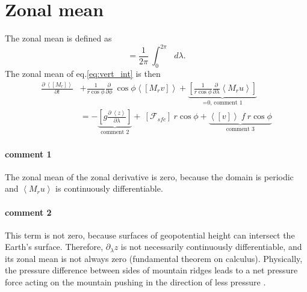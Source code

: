 \documentclass[11pt]{article}
\numberwithin{equation}{section}
\newcommand{\beq}{\begin{equation}}
\newcommand{\eeq}{\end{equation}}
\newcommand{\la}{\langle}
\newcommand{\ra}{\rangle}
\newcommand{\vect}[1]{\boldsymbol{#1}}
\newcommand{\Dt}[1]{\frac{D#1}{D t}}
\newcommand{\lara}[1]{\left\la{#1}\right\ra}
\newcommand{\cphi}{\cos \phi}
\begin{document}
\section{Zonal mean}
The zonal mean is defined as 
\beq
[~\cdot~] =  \frac{1}{2 \pi} ~ \int_0^ {2 \pi} ~~~ d\lambda.
\eeq
%
%
The zonal mean of eq.\eqref{eq:vert_int} is then 
\begin{align} \label{eq:vert_int_zm}
\frac{\partial ~\lara{[M_r]}}{\partial t}  &+ \frac{1}{r \cos{\phi}}  \frac{\partial}{\partial \phi}  ~\cos{\phi} \lara{ [M_r v] } + \underbrace{\left[ \frac{1}{r \cos{\phi}} \frac{\partial}{\partial \lambda} \lara{M_r u} \right]}_\text{=0, comment 1} \nonumber \\
 &=   - \underbrace{\left[ g  \frac{\partial~\lara{z}}{\partial \lambda}  \right]}_\text{comment 2}+ ~ [\mathcal{F}_{sfc}] ~ r \cphi + \underbrace{\lara{ [v]} ~ f ~r \cphi }_\text{comment 3}
\end{align}

\paragraph{comment 1}
The zonal mean of the zonal derivative is zero, because the domain is periodic and $\lara{ M_r u}$ is continuously differentiable.

\paragraph{comment 2}
This term is not zero, because surfaces of geopotential height can intersect the Earth's surface. Therefore, $\partial_\lambda z$ is not necessarily continuously  differentiable, and its zonal mean is not always zero (fundamental theorem on calculus). Physically, the pressure difference between sides of mountain ridges leads to a net pressure force acting on the mountain pushing in the direction of less pressure \citep[][chapter11.1.14]{Peixoto2008}. 
\end{document}
